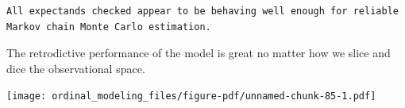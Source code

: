 \documentclass[
  letterpaper,
  DIV=11,
  numbers=noendperiod]{scrartcl}
\newenvironment{Shaded}{\begin{snugshade}}{\end{snugshade}}
\newcommand{\AttributeTok}[1]{\textcolor[rgb]{0.40,0.45,0.13}{#1}}
\newcommand{\DecValTok}[1]{\textcolor[rgb]{0.68,0.00,0.00}{#1}}
\newcommand{\FloatTok}[1]{\textcolor[rgb]{0.68,0.00,0.00}{#1}}
\newcommand{\FunctionTok}[1]{\textcolor[rgb]{0.28,0.35,0.67}{#1}}
\newcommand{\NormalTok}[1]{\textcolor[rgb]{0.00,0.23,0.31}{#1}}
\newcommand{\SpecialCharTok}[1]{\textcolor[rgb]{0.37,0.37,0.37}{#1}}
\newcommand{\StringTok}[1]{\textcolor[rgb]{0.13,0.47,0.30}{#1}}
\begin{document}
\begin{verbatim}
All expectands checked appear to be behaving well enough for reliable
Markov chain Monte Carlo estimation.
\end{verbatim}

The retrodictive performance of the model is great no matter how we
slice and dice the observational space.

\begin{Shaded}
\end{Shaded}

\texttt{[image: ordinal\_modeling\_files/figure-pdf/unnamed-chunk-85-1.pdf]}
\end{document}
